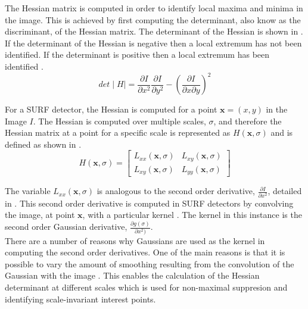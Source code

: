 \documentclass{article}
\begin{document}
The Hessian matrix is computed in order to identify local maxima and minima in the image. This is achieved by first computing the determinant, also know as the discriminant, of the Hessian matrix. The determinant of the Hessian is shown in . If the determinant of the Hessian is negative then a local extremum has not been identified. If the determinant is positive then a local extremum has been identified \cite{Evans2009}. \\

\begin{equation}
det\mid H \mid = \frac{\partial I}{\partial x^2} \frac{\partial I}{\partial y^2} - (\frac{\partial I}{\partial x \partial y})^2
\label{eqn:determinant}
\end{equation}

For a SURF detector, the Hessian is computed for a point $\textbf{x} = (x,y)$ in the Image $I$. The Hessian is computed over multiple scales, $\sigma$, and therefore the Hessian matrix at a point for a specific scale is represented as $H(\textbf{x}, \sigma)$ \cite{Lowe2004} and is defined as shown in .\\


\begin{equation}
H(\textbf{x}, \sigma) = \left[ \begin{array}{cc} L_{xx}(\textbf{x}, \sigma) & L_{xy}(\textbf{x}, \sigma)\\
					    L_{xy}(\textbf{x}, \sigma) & L_{yy}(\textbf{x}, \sigma)\end{array} \right]
\label{eqn:hessianScale}
\end{equation}

The variable $L_{xx}(\textbf{x}, \sigma)$ is analogous to the second order derivative, $ \frac{\partial I}{\partial x^2}$, detailed in . This second order derivative is computed in SURF detectors by convolving the image, at point $\textbf{x}$, with a particular kernel \cite{Evans2009}. The kernel in this instance is the second order Gaussian derivative, $\frac{\partial g(\sigma)}{\partial x^2)}$. \\

There are a number of reasons why Gaussians are used as the kernel in computing the second order derivatives. One of the main reasons is that it is possible to vary the amount of smoothing resulting from the convolution of the Gaussian with the image \cite{Evans2009}. This enables the calculation of the Hessian determinant at different scales which is used for non-maximal suppresion and identifying scale-invariant interest points.\\
\end{document}
